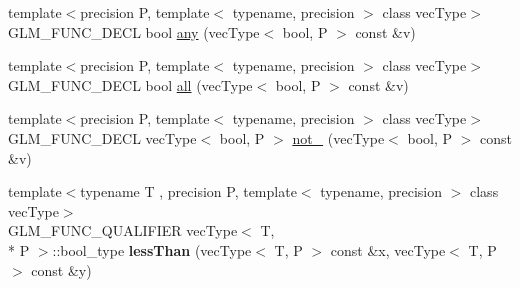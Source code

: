 \begin{DoxyCompactItemize}
\item 
{\footnotesize template$<$precision P, template$<$ typename, precision $>$ class vec\-Type$>$ }\\G\-L\-M\-\_\-\-F\-U\-N\-C\-\_\-\-D\-E\-C\-L bool \hyperlink{group__core__func__vector__relational_ga632a2644532d9332011c8860400d30b2}{any} (vec\-Type$<$ bool, P $>$ const \&v)
\item 
{\footnotesize template$<$precision P, template$<$ typename, precision $>$ class vec\-Type$>$ }\\G\-L\-M\-\_\-\-F\-U\-N\-C\-\_\-\-D\-E\-C\-L bool \hyperlink{group__core__func__vector__relational_ga14bbc94f2ae2774a1d64d91f8767773e}{all} (vec\-Type$<$ bool, P $>$ const \&v)
\item 
{\footnotesize template$<$precision P, template$<$ typename, precision $>$ class vec\-Type$>$ }\\G\-L\-M\-\_\-\-F\-U\-N\-C\-\_\-\-D\-E\-C\-L vec\-Type$<$ bool, P $>$ \hyperlink{group__core__func__vector__relational_ga4329ecbc2ef012c9ec704bd09da1f177}{not\-\_\-} (vec\-Type$<$ bool, P $>$ const \&v)
\item 
\hypertarget{namespaceglm_a9ea052832f152d1233c6fa27df62f2fc}{{\footnotesize template$<$typename T , precision P, template$<$ typename, precision $>$ class vec\-Type$>$ }\\G\-L\-M\-\_\-\-F\-U\-N\-C\-\_\-\-Q\-U\-A\-L\-I\-F\-I\-E\-R vec\-Type$<$ T, \\*
P $>$\-::bool\-\_\-type {\bfseries less\-Than} (vec\-Type$<$ T, P $>$ const \&x, vec\-Type$<$ T, P $>$ const \&y)}\label{namespaceglm_a9ea052832f152d1233c6fa27df62f2fc}


\end{DoxyCompactItemize}
